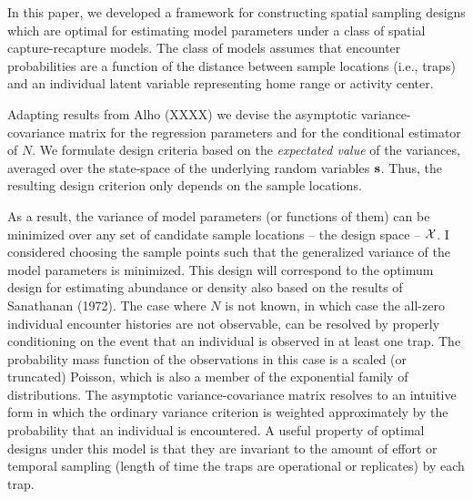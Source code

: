 \documentclass[useAMS,referee]{biom}
\begin{document}
In this paper, we developed a framework for constructing spatial
sampling designs which are optimal for estimating model parameters
under a class of spatial capture-recapture models.  The class of
models assumes that encounter probabilities are a function of the 
distance between sample locations (i.e., traps) and an individual
latent 
variable representing home range or activity center.  

Adapting results from Alho (XXXX) we devise the asymptotic
variance-covariance matrix for the regression parameters  and for the
conditional estimator of $N$. We formulate design criteria based on
the {\it expectated value} of the  variances, averaged over the
state-space of the underlying random variables ${\bf s}$. Thus, the
resulting design criterion only depends on the sample locations.

As a result, the variance of model parameters (or
functions of them) can be minimized over any set of candidate sample
locations -- the design space -- ${\cal X}$.  I considered choosing
the sample points such that the generalized variance of the model
parameters is minimized.  This design will correspond to the optimum
design for estimating abundance or density also based on the results
of Sanathanan (1972).  The case where $N$ is not known, in which case
the all-zero individual encounter histories are not observable, can be
resolved by properly conditioning on the event that an individual is
observed in at least one trap. The probability mass function of the
observations in this case is a scaled (or truncated) Poisson, which is
also a member of the exponential family of distributions. The
asymptotic variance-covariance matrix resolves to an intuitive form in
which the ordinary variance criterion is weighted approximately by the
probability that an individual is encountered.
A useful property of optimal designs under this model
is that they are invariant to the amount of
effort or temporal sampling (length of time the traps are operational or 
replicates) by each trap.
\end{document}
